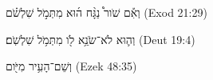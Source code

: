 
\begin{exe}

\ex\label{postdur_instr_exs1}
\texthebrew{
וְאִ֡ם שֹׁור֩ נַגָּ֨ח ה֜וּא מִתְּמֹ֣ל שִׁלְשֹׁ֗ם 
} (Exod 21:29)

\ex\label{postdur_instr_exs2}
\texthebrew{
וְה֛וּא לֹא־שֹׂנֵ֥א לֹ֖ו מִתְּמֹ֥ל שִׁלְשֹֽׁם׃ 
} (Deut 19:4)

\ex\label{postdur_instr_exs3}
\texthebrew{
וְשֵׁם־הָעִ֥יר מִיֹּ֖ום 
} (Ezek 48:35)

\end{exe}
